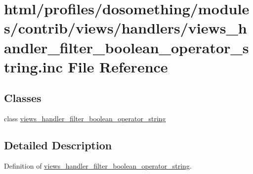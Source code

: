 \hypertarget{views__handler__filter__boolean__operator__string_8inc}{
\section{html/profiles/dosomething/modules/contrib/views/handlers/views\_\-handler\_\-filter\_\-boolean\_\-operator\_\-string.inc File Reference}
\label{views__handler__filter__boolean__operator__string_8inc}
}
\subsection*{Classes}
\begin{DoxyCompactItemize}
\item 
class \hyperlink{classviews__handler__filter__boolean__operator__string}{views\_\-handler\_\-filter\_\-boolean\_\-operator\_\-string}
\end{DoxyCompactItemize}


\subsection{Detailed Description}
Definition of \hyperlink{classviews__handler__filter__boolean__operator__string}{views\_\-handler\_\-filter\_\-boolean\_\-operator\_\-string}. 